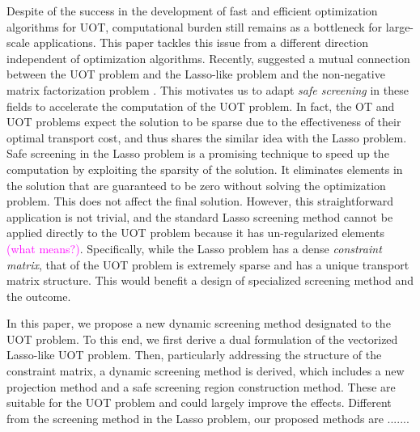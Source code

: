 \documentclass[twoside]{article}
\theoremstyle{plain}
\newcommand{\note}[1]{\textcolor{magenta}{#1}}
\begin{document}
Despite of the success in the development of fast and efficient optimization algorithms for UOT, computational burden still remains as a bottleneck for large-scale applications. This paper tackles this issue from a different direction independent of optimization algorithms. Recently, \cite{Chapel_NeurIPS_2021} suggested a mutual connection between the UOT problem and the Lasso-like problem \citep{Tibshirani_JRSS_1996,Efron_AM_2004} and the non-negative matrix factorization problem \citep{Lee_NIPS_2000}. This motivates us to adapt {\it safe screening} \citep{ghaoui2010safe} in these fields to accelerate the computation of the UOT problem. In fact, the OT and UOT problems expect the solution to be sparse due to the effectiveness of their optimal transport cost, and thus shares the similar idea with the Lasso problem. 
Safe screening in the Lasso problem is a promising technique to speed up the computation by exploiting the sparsity of the solution. It eliminates elements in the solution that are guaranteed to be zero without solving the optimization problem. This does not affect the final solution. However, this straightforward application is not trivial, and the standard Lasso screening method cannot be applied directly to the UOT problem because it has un-regularized elements \note{(what means?)}. 
Specifically, while the Lasso problem has a dense {\it constraint matrix}, that of the UOT problem is extremely sparse and has a unique transport matrix structure. This would benefit a design of specialized screening method and the outcome. 
%


In this paper, we propose a new dynamic screening method designated to the UOT problem. To this end, we first derive a dual formulation of the vectorized Lasso-like UOT problem. Then, particularly addressing the structure of the constraint matrix, a dynamic screening method is derived, which includes a new projection method and a safe screening region construction method. These are suitable for the UOT problem and could largely improve the effects. Different from the screening method in the Lasso problem, our proposed methods are .......
\end{document}
